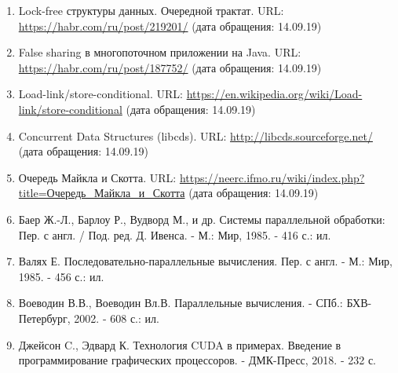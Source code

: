 {\begin{enumerate}
		. Проблема АВА. URL: \href{https://ru.wikipedia.org/wiki/%D0%9F%D1%80%D0%BE%D0%B1%D0%BB%D0%B5%D0%BC%D0%B0_ABA} {https://ru.wikipedia.org/wiki/Проблема\_АВА} (дата обращения: 14.02.19).
		 память: история и развитие. URL: \href{https://habr.com/ru/post/221667/}{https://habr.com/ru/post/221667/} (дата обращения: 14.02.19).
		. Модель акторов. URL: \href{https://ru.wikipedia.org/wiki/%D0%9C%D0%BE%D0%B4%D0%B5%D0%BB%D1%8C_%D0%B0%D0%BA%D1%82%D0%BE%D1%80%D0%BE%D0%B2}{https://ru.wikipedia.org/wiki/Модель\_Акторов} (дата обращения: 14.02.19).
		, Томас Х. и др. Алгоритмы: построение и анализ, 3-е изд. : Пер. с англ. - М. : ООО ''И. Д. Вильямс'', 2013. - 1328 с. : ил. - Парал. тит. англ.
		\item Lock-free структуры данных. Очередной трактат. URL: \href{https://habr.com/ru/post/219201/}{https://habr.com/ru/post/219201/} (дата обращения: 14.09.19)
		\item False sharing в многопоточном приложении на Java. URL: \href{https://habr.com/ru/post/187752/}{https://habr.com/ru/post/187752/} (дата обращения: 14.09.19)
		\item Load-link/store-conditional. URL: \href{https://en.wikipedia.org/wiki/Load-link/store-conditional}{https://en.wikipedia.org/wiki/Load-link/store-conditional} (дата обращения: 14.09.19)
		\item Concurrent Data Structures (libcds). URL: \href{http://libcds.sourceforge.net/}{http://libcds.sourceforge.net/} (дата обращения: 14.09.19)
		\item Очередь Майкла и Скотта. URL: \href{https://neerc.ifmo.ru/wiki/index.php?title=%D0%9E%D1%87%D0%B5%D1%80%D0%B5%D0%B4%D1%8C_%D0%9C%D0%B0%D0%B9%D0%BA%D0%BB%D0%B0_%D0%B8_%D0%A1%D0%BA%D0%BE%D1%82%D1%82%D0%B0} {https://neerc.ifmo.ru/wiki/index.php?title=Очередь\_Майкла\_и\_Скотта} (дата обращения: 14.09.19)
		\item Баер Ж.-Л., Барлоу Р., Вудворд М., и др. Системы параллельной обработки: Пер. с англ. / Под. ред. Д. Ивенса. - М.: Мир, 1985. - 416 с.: ил.
		\item Валях Е. Последовательно-параллельные вычисления. Пер. с англ. - М.: Мир, 1985. - 456 с.: ил.
		\item Воеводин В.В., Воеводин Вл.В. Параллельные вычисления. - СПб.: БХВ-Петербург, 2002. - 608 с.: ил.
        \item Джейсон C., Эдвард К. Технология CUDA в примерах. Введение в программирование графических процессоров. - ДМК-Пресс, 2018. - 232 с.
	\end{enumerate}
}